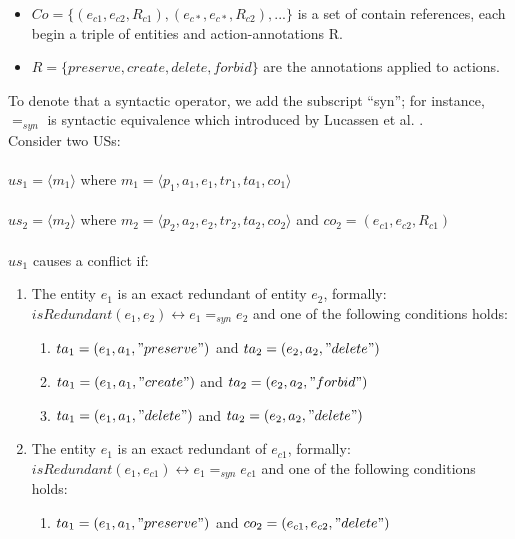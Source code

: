 \begin{definition}
\begin{itemize}
\begin{itemize}
		\item $Co = \{ (e_{c1},e_{c2},R_{c1}),(e_{c*},e_{c*},R_{c2}),... \}$ is a set of contain references, each begin a triple of entities and action-annotations R.
		
		\item $R = \{preserve, create, delete, forbid\}$ are the annotations applied to actions.
	\end{itemize}
	
	\end{itemize}
	To denote that a syntactic operator, we add the subscript
	“syn”; for instance, $=_{syn}$ is syntactic equivalence which introduced by Lucassen et al. \cite{lucassen2016improving}.\\ Consider two USs:\\\\ $us_1 = \langle m_1\rangle $ where $m_1 = \langle p_1,a_1,e_1,tr_1,ta_1,co_1 \rangle$ \\\\$us_2 = \langle m_2\rangle$ where $m_2 = \langle p_2,a_2,e_2,tr_2,ta_2,co_2 \rangle$ and $co_2 = (e_{c1},e_{c2},R_{c1})$\\\\
	$us_1$ causes a conflict if:
	\begin{enumerate}
		\item The entity $e_1$ is an exact redundant of entity $e_2$, formally:\\ $isRedundant(e_1,e_2) \leftrightarrow e_1 =_{syn} e_2$ and one of the following conditions holds:\\
		\begin{enumerate}
			\item $ta_1 = (e_1,a_1,"preserve")$ and $ta_2 = (e_2,a_2,"delete")$
			
			\item $ta_1 = (e_1,a_1,"create")$ and $ta_2 = (e_2,a_2,"forbid")$
			
			\item $ta_1 = (e_1,a_1,"delete")$ and $ta_2 = (e_2,a_2,"delete")$
		\end{enumerate}
		
		\item The entity $e_1$ is an exact redundant of  $e_{c1}$, formally:\\ $isRedundant(e_1,e_{c1}) \leftrightarrow e_1 =_{syn} e_{c1}$ and one of the following conditions holds:\\
		\begin{enumerate}
			\item $ta_1 = (e_1,a_1,"preserve")$ and $co_2 = (e_{c1},e_{c2},"delete")$
			

\end{enumerate}
\end{enumerate}
\end{definition}
